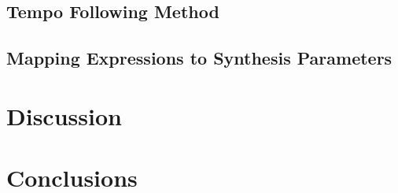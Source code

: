 \section{Tempo Following Method}

\section{Mapping Expressions to Synthesis Parameters}

\chapter{Discussion}
\label{chapter:discussion}

\chapter{Conclusions}
\label{chapter:conclusions}



